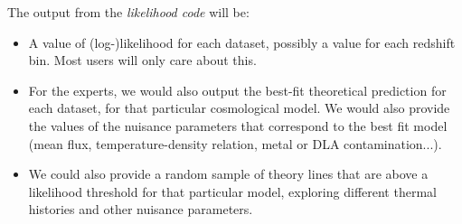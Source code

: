 
The output from the \textit{likelihood code} will be:
\begin{itemize}
 \item A value of (log-)likelihood for each dataset, possibly a value for 
  each redshift bin. 
  Most users will only care about this.
 \item For the experts, we would also output the best-fit theoretical 
  prediction for each dataset, for that particular cosmological model.
  We would also provide the values of the nuisance parameters that correspond
  to the best fit model (mean flux, temperature-density relation, metal or DLA
  contamination...).
 \item We could also provide a random sample of theory lines that are above a 
  likelihood threshold for that particular model, exploring different 
  thermal histories and other nuisance parameters.
\end{itemize}

